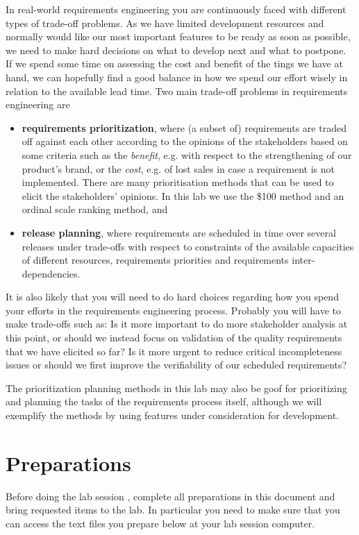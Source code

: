 \documentclass[11pt]{article}
\begin{document}
In real-world requirements engineering you are continuously faced with different types of trade-off problems. As we have limited development resources and normally would like our most important features to be ready as soon as possible, we need to make hard decisions on what to develop next and what to postpone. If we spend some time on assessing the cost and benefit of the tings we have at hand, we can hopefully find a good balance in how we spend our effort wisely in relation to the available lead time. Two main trade-off problems in requirements engineering are
\begin{itemize}
\item {\bf requirements prioritization}, where (a subset of) requirements are traded off against each other according to the opinions of the stakeholders based on some criteria such as the {\it benefit}, e.g. with respect to the strengthening of our product's brand, or the {\it cost}, e.g. of lost sales in case a requirement is not implemented. There are many prioritisation methods that can be used to elicit the stakeholders'
opinions. In this lab we use the \$100 method and an ordinal scale ranking method, and
\item {\bf release planning}, where requirements are scheduled in time over several releases under trade-offs with respect to constraints of the available capacities of different resources, requirements priorities and requirements inter-dependencies. 
\end{itemize}

It is also likely that you will need to do hard choices regarding how you spend your efforts in the requirements engineering process. Probably you will have to make trade-offs such as: Is it more important to do more stakeholder analysis at this point, or should we instead focus on validation of the quality requirements that we have elicited so far? Is it more urgent to reduce critical incompleteness issues or should we first improve the verifiability of our scheduled requirements?

The prioritization planning methods in this lab may also be goof for prioritizing and planning the tasks of the requirements process itself, although we will exemplify the methods by using features under consideration for development.



\clearpage\newpage
\section{Preparations}\label{section:prep}
\begin{framed} \noindent Before doing the lab session%
, complete all preparations in this document %
and bring requested items to the lab. In particular you need to make sure that you can access the text files you prepare below at your lab session computer.
\end{framed}
\end{document}
